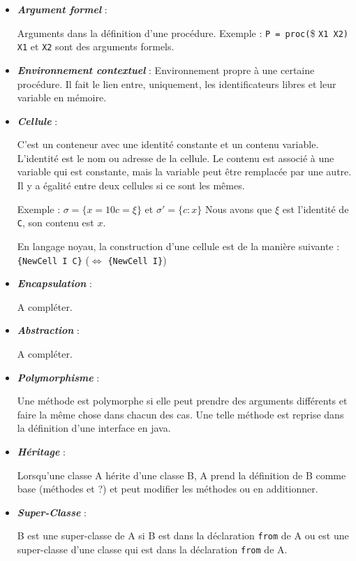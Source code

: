 \begin{itemize}
  \item \textbf{\textit{Argument formel}} :

    Arguments dans la définition d'une procédure. Exemple : \verb$P = proc($\$ \verb$X1 X2)$ \verb$X1$ et \verb$X2$ sont des arguments formels.

  \item \textbf{\textit{Environnement contextuel}} :
    Environnement propre à une certaine procédure. Il fait le lien entre, uniquement, les identificateurs libres et leur variable en mémoire.

  \item \textbf{\textit{Cellule}} :

    C'est un conteneur avec une identité constante et un contenu variable. L'identité est le nom ou adresse de la cellule. Le contenu est associé à une variable qui est constante, mais la variable peut être remplacée par une autre. Il y a égalité entre deux cellules si ce sont les mêmes.

    Exemple : $\sigma = \{ x=10 c=\xi\}$ et $\sigma' = \{c:x\}$
    Nous avons que $\xi$ est l'identité de \verb$C$, son contenu est $x$.

    En langage noyau, la construction d'une cellule est de la manière suivante : \verb${NewCell I C}$ ($\Leftrightarrow$ \verb${NewCell I}$)

  \item \textbf{\textit{Encapsulation}} : 

    A compléter.

  \item \textbf{\textit{Abstraction}} :

    A compléter.

  \item \textbf{\textit{Polymorphisme}} :

    Une méthode est polymorphe si elle peut prendre des arguments différents et faire la même chose dans chacun des cas. Une telle méthode est reprise dans la définition d'une interface en java.

  \item \textbf{\textit{Héritage}} :

    Lorsqu'une classe A hérite d'une classe B, A prend la définition de B comme base (méthodes et ?) et peut modifier les méthodes ou en additionner.

  \item \textbf{\textit{Super-Classe}} :

    B est une super-classe de A si B est dans la déclaration \verb$from$ de A ou est une super-classe d'une classe qui est dans la déclaration \verb$from$ de A.


\end{itemize}
